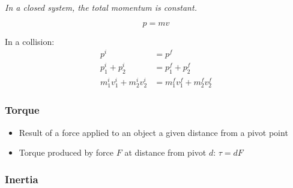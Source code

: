 \documentclass[a4paper]{article}
\begin{document}
\textit{In a closed system, the total momentum is constant.}

\[
  p = mv
\]

In a collision:
\begin{align*}
  p^{i} &= p^{f} \\
  p^{i}_{1} + p^{i}_{2} &= p^{f}_{1} + p^{f}_{2} \\
  m^{i}_{1} v^{i}_{1} + m^{i}_{2} v^{i}_{2} &= m^{f}_{1} v^{f}_{1} + m^{f}_{2} v^{f}_{2}
\end{align*}

\subsubsection{Torque}

\begin{itemize}
  \item
    Result of a force applied to an object a given distance from a pivot point

  \item
    Torque produced by force $F$ at distance from pivot $d$: $\tau = dF$

\end{itemize}

\subsubsection{Inertia}
\end{document}
